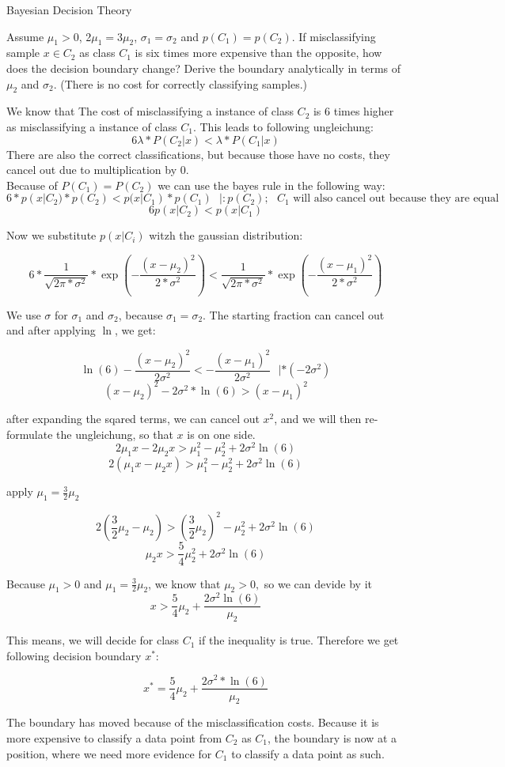 \documentclass[
	english,
        solution=true
	]{tudaexercise}
\begin{document}
\begin{task}[points=4 + 8 + 8]{Bayesian Decision Theory}
\begin{subtask}[points=8,title=Different Misclassification Costs]
Assume $\mu_1 > 0$, 2$\mu_1 = 3\mu_2$, $\sigma_1=\sigma_2$ and $p(C_1) = p(C_2)$. If misclassifying sample $x \in C_2$ as class $C_1$ is six times more expensive than the opposite, how does the decision boundary change? Derive the boundary analytically in terms of $\mu_2$ and $\sigma_2$.
(There is no cost for correctly classifying samples.)
\begin{solution}
We know that The cost of misclassifying a instance of class $C_2$ is $6$ times higher as misclassifying a instance of class $C_1$. This leads to following ungleichung:
\[6\lambda*P(C_2|x)<\lambda*P(C_1|x)\]
There are also the correct classifications, but because those have no costs, they cancel out due to multiplication by 0.\\
Because of $P(C_1)=P(C_2)$ we can use the bayes rule in the following way:
\[6*p(x|C_2)*p(C_2)<p(x|C_1)*p(C_1) \,\,\,\, |:p(C_2); \text{ $C_1$ will also cancel out because they are equal}\]
\[6p(x|C_2)<p(x|C_1)\]

Now we substitute $p(x|C_i)$ witzh the gaussian distribution:

\[6*\frac{1}{\sqrt{2 \pi * \sigma^2}}*\exp (-\frac{(x-\mu_2)^2}{2*\sigma^2})<\frac{1}{\sqrt{2 \pi * \sigma^2}}*\exp (-\frac{(x-\mu_1)^2}{2*\sigma^2})\]

We use $\sigma$ for $\sigma_1$ and $\sigma_2$, because $\sigma_1=\sigma_2$. The starting fraction can cancel out and after applying $\ln$, we get:

\[\ln(6)-\frac{(x-\mu_2)^2}{2\sigma^2} <-\frac{(x-\mu_1)^2}{2\sigma^2} \,\,\,\, | * (-2\sigma^2)\]
\[(x-\mu_2)^2-2\sigma^2*\ln(6) > (x-\mu_1)^2\]

after expanding the sqared terms, we can cancel out $x^2$, and we will then re-formulate the ungleichung, so that $x$ is on one side.
\[2\mu_1x-2\mu_2x>\mu_1^2-\mu_2 ^2 + 2\sigma^2 \ln(6)\]
\[2(\mu_1x-\mu_2x)>\mu_1^2-\mu_2 ^2 + 2\sigma^2 \ln(6)\]

apply $\mu_1=\frac{3}{2}\mu_2$

\[2(\frac{3}{2}\mu_2-\mu_2)>(\frac{3}{2}\mu_2)^2-\mu^2_2 + 2\sigma^2\ln(6)\]
\[\mu_2x > \frac{5}{4}\mu^2_2+2\sigma^2\ln(6)\]

Because $\mu_1>0$ and $\mu_1=\frac{3}{2}\mu_2$, we know that $\mu_2>0, $ so we can devide by it
\[x > \frac{5}{4}\mu_2+\frac{2\sigma^2 \ln(6)}{\mu_2}\]

This means, we will decide for class $C_1$ if the inequality is true. Therefore we get following decision boundary $x^*$:

\[x^*=\frac{5}{4}\mu_2+\frac{2\sigma^2*\ln(6)}{\mu_2}\]

The boundary has moved because of the misclassification costs. Because it is more expensive to classify a data point from $C_2$ as $C_1$, the boundary is now at a position, where we need more evidence for $C_1$ to classify a data point as such. 

\end{solution}
\end{subtask}
\end{task}
\end{document}
